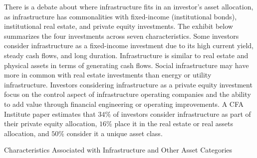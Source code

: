 \documentclass[11pt]{article}
\begin{document}
There is a debate about where infrastructure fits in an investor's asset allocation, as infrastructure has commonalities with fixed-income (institutional bonds), institutional real estate, and private equity investments. The exhibit below summarizes the four investments across seven characteristics. Some investors consider infrastructure as a fixed-income investment due to its high current yield, steady cash flows, and long duration. Infrastructure is similar to real estate and physical assets in terms of generating cash flows. Social infrastructure may have more in common with real estate investments than energy or utility infrastructure. Investors considering infrastructure as a private equity investment focus on the control aspect of infrastructure operating companies and the ability to add value through financial engineering or operating improvements. A CFA Institute paper estimates that $34 \%$ of investors consider infrastructure as part of their private equity allocation, $16 \%$ place it in the real estate or real assets allocation, and $50 \%$ consider it a unique asset class.

Characteristics Associated with Infrastructure and Other Asset Categories
\end{document}
